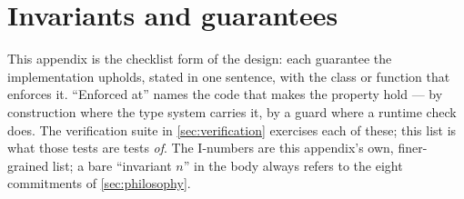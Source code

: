 \section{Invariants and guarantees}\label{sec:invariants}

This appendix is the checklist form of the design: each guarantee the implementation
upholds, stated in one sentence, with the class or function that enforces it. ``Enforced
at'' names the code that makes the property hold --- by construction where the type
system carries it, by a guard where a runtime check does. The verification suite in
\cref{sec:verification} exercises each of these; this list is what those tests are
tests \emph{of}. The I-numbers are this appendix's own, finer-grained list; a bare
``invariant $n$'' in the body always refers to the eight commitments of
\cref{sec:philosophy}.

